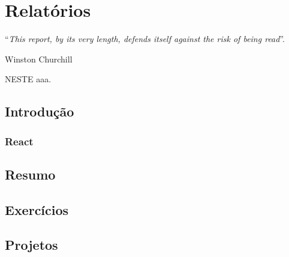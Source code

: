 \chapter{Relatórios}\label{cap:relatorios}
\epigraph{``\textit{This report, by its very length, defends itself against the risk of being read}''.}{Winston Churchill}

\lettrine[lines=4, lhang=0.1, lraise=0, loversize=0.2, findent=0.1em]{\textcolor{corTema}{N}}{ESTE} aaa.

\vfill

\section{Introdução}



\subsection{React}

\section{Resumo}

\section{Exercícios}

\section{Projetos}